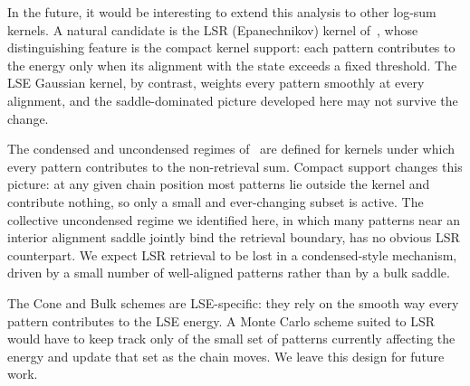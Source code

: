 \documentclass[letterpaper]{article} %
\begin{document}
In the future, it would be interesting to extend this analysis to other log-sum kernels. A natural candidate is the LSR (Epanechnikov) kernel of~\citet{hoover2025dense}, whose distinguishing feature is the compact kernel support: each pattern contributes to the energy only when its alignment with the state exceeds a fixed threshold. The LSE Gaussian kernel, by contrast, weights every pattern smoothly at every alignment, and the saddle-dominated picture developed here may not survive the change.

The condensed and uncondensed regimes of~\citet{lucibello2024exponential} are defined for kernels under which every pattern contributes to the non-retrieval sum. Compact support changes this picture: at any given chain position most patterns lie outside the kernel and contribute nothing, so only a small and ever-changing subset is active. The collective uncondensed regime we identified here, in which many patterns near an interior alignment saddle jointly bind the retrieval boundary, has no obvious LSR counterpart. We expect LSR retrieval to be lost in a condensed-style mechanism, driven by a small number of well-aligned patterns rather than by a bulk saddle.

The Cone and Bulk schemes are LSE-specific: they rely on the smooth way every pattern contributes to the LSE energy. A Monte Carlo scheme suited to LSR would have to keep track only of the small set of patterns currently affecting the energy and update that set as the chain moves. We leave this design for future work.







\end{document}
